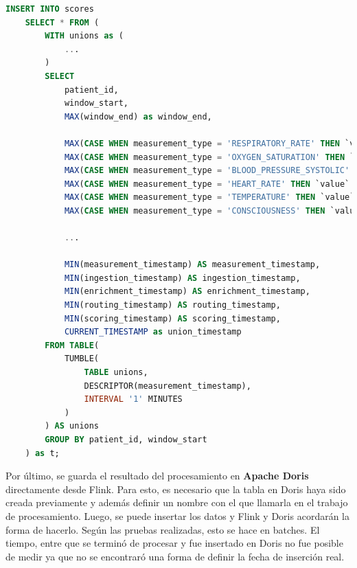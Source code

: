 \begin{lstlisting}[language=sql]
    INSERT INTO scores
    SELECT * FROM (
        WITH unions as (
            ...
        )
        SELECT 
            patient_id,
            window_start,
            MAX(window_end) as window_end,

            MAX(CASE WHEN measurement_type = 'RESPIRATORY_RATE' THEN `value` END) as respiratory_rate_value,
            MAX(CASE WHEN measurement_type = 'OXYGEN_SATURATION' THEN `value` END) as oxygen_saturation_value,
            MAX(CASE WHEN measurement_type = 'BLOOD_PRESSURE_SYSTOLIC' THEN `value` END) as blood_pressure_value,
            MAX(CASE WHEN measurement_type = 'HEART_RATE' THEN `value` END) as heart_rate_value,
            MAX(CASE WHEN measurement_type = 'TEMPERATURE' THEN `value` END) as temperature_value,
            MAX(CASE WHEN measurement_type = 'CONSCIOUSNESS' THEN `value` END) as consciousness_value,

            ...

            MIN(measurement_timestamp) AS measurement_timestamp,
            MIN(ingestion_timestamp) AS ingestion_timestamp,
            MIN(enrichment_timestamp) AS enrichment_timestamp,
            MIN(routing_timestamp) AS routing_timestamp,
            MIN(scoring_timestamp) AS scoring_timestamp,
            CURRENT_TIMESTAMP as union_timestamp
        FROM TABLE(
            TUMBLE(
                TABLE unions, 
                DESCRIPTOR(measurement_timestamp), 
                INTERVAL '1' MINUTES
            )
        ) AS unions 
        GROUP BY patient_id, window_start
    ) as t;
\end{lstlisting}

\newpage
Por último, se guarda el resultado del procesamiento en \textbf{Apache Doris} directamente desde Flink.
Para esto, es necesario que la tabla en Doris haya sido creada previamente y además definir un nombre con el que llamarla en el trabajo de procesamiento.
Luego, se puede insertar los datos y Flink y Doris acordarán la forma de hacerlo. Según las pruebas realizadas, esto se hace en batches. 
El tiempo, entre que se terminó de procesar y fue insertado en Doris no fue posible de medir ya que no se encontraró una forma de definir la fecha de inserción real.

\newpage

